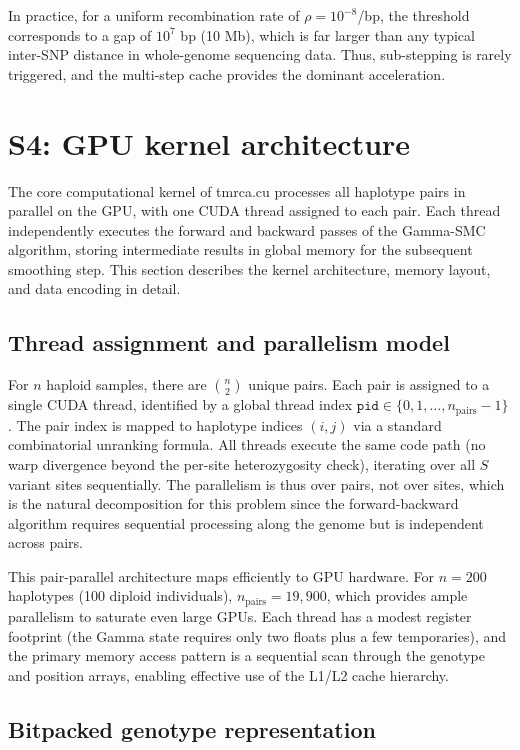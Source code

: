 \documentclass[10pt,letterpaper]{article}
\begin{document}
In practice, for a uniform recombination rate of $\rho = 10^{-8}$/bp, the threshold corresponds to a gap of $10^7$ bp (10 Mb), which is far larger than any typical inter-SNP distance in whole-genome sequencing data. Thus, sub-stepping is rarely triggered, and the multi-step cache provides the dominant acceleration.


\section{S4: GPU kernel architecture}

The core computational kernel of tmrca.cu processes all haplotype pairs in parallel on the GPU, with one CUDA thread assigned to each pair. Each thread independently executes the forward and backward passes of the Gamma-SMC algorithm, storing intermediate results in global memory for the subsequent smoothing step. This section describes the kernel architecture, memory layout, and data encoding in detail.

\subsection{Thread assignment and parallelism model}

For $n$ haploid samples, there are $\binom{n}{2}$ unique pairs. Each pair is assigned to a single CUDA thread, identified by a global thread index $\texttt{pid} \in \{0, 1, \ldots, n_{\mathrm{pairs}}-1\}$. The pair index is mapped to haplotype indices $(i, j)$ via a standard combinatorial unranking formula. All threads execute the same code path (no warp divergence beyond the per-site heterozygosity check), iterating over all $S$ variant sites sequentially. The parallelism is thus over pairs, not over sites, which is the natural decomposition for this problem since the forward-backward algorithm requires sequential processing along the genome but is independent across pairs.

This pair-parallel architecture maps efficiently to GPU hardware. For $n = 200$ haplotypes (100 diploid individuals), $n_{\mathrm{pairs}} = 19{,}900$, which provides ample parallelism to saturate even large GPUs. Each thread has a modest register footprint (the Gamma state requires only two floats plus a few temporaries), and the primary memory access pattern is a sequential scan through the genotype and position arrays, enabling effective use of the L1/L2 cache hierarchy.

\subsection{Bitpacked genotype representation}
\end{document}
